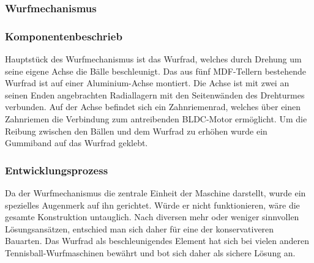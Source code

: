 \subsubsection{Wurfmechanismus}
\subsubsection*{Komponentenbeschrieb}

Hauptstück des Wurfmechanismus ist das Wurfrad, welches durch Drehung um seine eigene Achse die Bälle beschleunigt.
Das aus fünf MDF-Tellern bestehende Wurfrad ist auf einer Aluminium-Achse montiert. Die Achse ist mit zwei an seinen Enden angebrachten Radiallagern mit den Seitenwänden des Drehturmes verbunden. Auf der Achse befindet sich ein Zahnriemenrad, welches über einen Zahnriemen die Verbindung zum antreibenden BLDC-Motor ermöglicht.
Um die Reibung zwischen den Bällen und dem Wurfrad zu erhöhen wurde ein Gummiband auf das Wurfrad geklebt.


\subsubsection*{Entwicklungsprozess}

Da der Wurfmechanismus die zentrale Einheit der Maschine darstellt, wurde ein spezielles Augenmerk auf ihn gerichtet. Würde er nicht funktionieren, wäre die gesamte Konstruktion untauglich. Nach diversen mehr oder weniger sinnvollen Lösungsansätzen, entschied man sich daher für eine der konservativeren Bauarten.
Das Wurfrad als beschleunigendes Element hat sich bei vielen anderen Tennisball-Wurfmaschinen bewährt und bot sich daher als sichere Lösung an.
